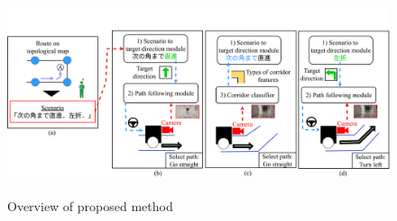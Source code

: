 \documentclass{sice-si}
\begin{document}
\begin{figure}[t]
    \centering
     \includegraphics[height=60mm,width=160mm]{./figs/absv3.png}
     \caption{Overview of proposed method}\label{fig:system}
\end{figure}
\end{document}
